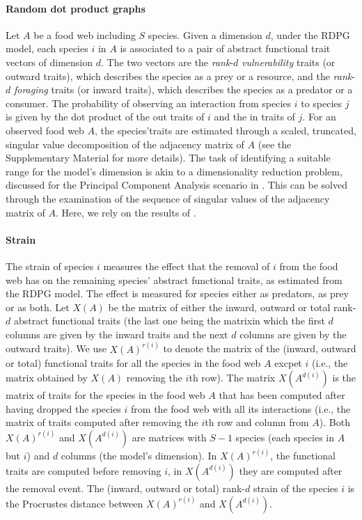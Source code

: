 \documentclass[12pt]{article}
\begin{document}
\paragraph{Random dot product graphs}\label{subsec:method_rdpg}
Let $A$ be a food web including $S$ species.
Given a dimension $d$, under the RDPG model, each species $i$ in $A$
is associated to a pair of abstract functional trait vectors of dimension $d$.
The two vectors are the \emph{rank}-$d$ \emph{vulnerability} traits (or outward traits), which describes the
species as a prey or a resource, and the \emph{rank}-$d$ \emph{foraging} traits (or inward
traits), which describes the species as a predator or a consumer. The probability of observing an
interaction from species $i$ to species $j$ is given by the dot product of the
out traits of $i$ and the in traits of $j$. For an observed food web $A$, the
species'traits are estimated through a scaled, truncated, singular value decomposition
of the adjacency matrix of $A$ \citep{dallariva2015exploring} (see the
Supplementary Material for more details). 
The task of identifying a suitable range for the model's dimension is akin to a
dimensionality reduction problem, discussed for the Principal Component
Analysis scenario in \citet{jolliffe2002principal}. This can be solved
through the examination of the sequence of singular values of the adjacency matrix
of $A$. Here, we rely on the results of \citet{dallariva2015exploring}.

\paragraph{Strain}
The strain of species $i$ measures the effect that the removal of $i$ from the food web
has on the remaining species' abstract functional traits, as estimated from the
RDPG model. The effect is measured for species either as predators, as prey or as both. 
Let $X(A)$ be the matrix of either the inward, outward or total rank-$d$ abstract
functional traits (the last one being the matrixin  which the first $d$ columns are
given by the inward traits and the next $d$ columns are given by the outward traits).
We use $X(A)^{r(i)}$ to denote the matrix of the (inward, outward or total)
functional traits for all the species in the food web $A$ excpet $i$ (i.e.,
the matrix obtained by $X(A)$ removing the $i$th row).  The matrix
$X\left(A^{d(i)}\right)$ is the matrix of traits for the species in the food
web $A$ that has been computed after having dropped the species $i$ from the food web with
all its interactions (i.e., the matrix of traits computed after removing the $i$th row and column from $A$).
Both $X(A)^{r(i)}$ and $X\left(A^{d(i)}\right)$ are matrices with $S-1$ species (each species
in $A$ but $i$) and $d$ columns (the model's dimension). In $X(A)^{r(i)}$, the functional
traits are computed before removing $i$, in $X\left(A^{d(i)}\right)$ they are computed
after the removal event.
The (inward, outward or total) rank-$d$ strain of the species $i$ is the Procrustes distance
between $X(A)^{r(i)}$ and $X\left(A^{d(i)}\right)$. 
\end{document}
